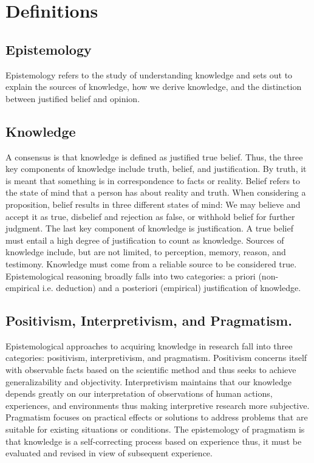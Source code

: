 \section{Definitions}
\label{sec:Definitions}

\subsection{Epistemology}
\label{subsec:Def_Epistemology}

Epistemology refers to the study of understanding knowledge and sets out to explain the sources of knowledge, how we derive knowledge, and the distinction between justified belief and opinion\cite{sol2022understanding}.

\subsection{Knowledge}
\label{subsec:Def_Knowledge}

A consensus is that knowledge is defined as justified true belief. Thus, the three key components of knowledge include truth, belief, and justification. By truth, it is meant that something is in correspondence to facts or reality. Belief refers to the state of mind that a person has about reality and truth\cite{sol2022understanding}.
When considering a proposition, belief results in three different states of mind: We may believe and accept it as true, disbelief and rejection as false, or withhold belief for further judgment. The last key component of knowledge is justification.
A true belief must entail a high degree of justification to count as knowledge. Sources of knowledge include, but are not limited, to perception, memory, reason, and testimony. Knowledge must come from a reliable source to be considered true. Epistemological reasoning broadly falls into two categories: a priori (non-empirical i.e. deduction) and a posteriori (empirical) justification of knowledge\cite{sol2022understanding}.


\subsection{Positivism, Interpretivism, and Pragmatism.}
\label{subsec:Def_Positivism}

Epistemological approaches to acquiring knowledge in research fall into three categories: positivism, interpretivism, and pragmatism. Positivism concerns itself with observable facts based on the scientific method and thus seeks to achieve generalizability and objectivity. Interpretivism maintains that our knowledge depends greatly on our interpretation of observations of human actions, experiences, and environments thus making interpretive research more subjective. Pragmatism focuses on practical effects or solutions to address problems that are suitable for existing situations or conditions. The epistemology of pragmatism is that knowledge is a self-correcting process based on experience thus, it must be evaluated and revised in view of subsequent experience\cite{sol2022understanding}.

